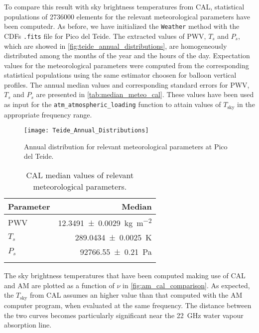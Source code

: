 To compare this result with sky brightness temperatures from CAL,
statistical populations of \num{2736000} elements for the relevant
meteorological parameters have been computedr. As before, we have
initialized the \texttt{Weather} method with the CDFs \texttt{.fits} file
for Pico del Teide. The extracted values of PWV, $T_s$ and $P_s$, which are
showed in \autoref{fig:teide_annual_distributions}, are homogeneously
distributed among the months of the year and the hours of the day.
Expectation values for the meteorological parameters were computed from the
corresponding statistical populations using the same estimator choosen for
balloon vertical profiles. The annual median values and corresponding
standard errors for PWV, $T_s$ and $P_s$ are presented in
\autoref{tab:median_meteo_cal}.  These values have been used as input for
the \texttt{atm\_atmospheric\_loading} function to attain values of $T_\text{sky}$
in the appropriate frequency range.

\begin{figure}
        \centering
        \texttt{[image: Teide\_Annual\_Distributions]}
        \caption{Annual distribution for relevant meteorological parameters
        at Pico del Teide.}
        \label{fig:teide_annual_distributions}
\end{figure}

\begin{table}
        \renewcommand{\arraystretch}{1.5}
        \centering
        \begin{tabular}{p{5cm} r}
                \hline
                Parameter & Median  \\
                \hline
                \hline
                PWV \dotfill & \SI{12.3491 \pm 0.0029}{\kilo\gram\per\square\meter} \\
                $T_s$ \dotfill& \SI{289.0434 \pm 0.0025}{\kelvin} \\
                $P_s$ \dotfill &  \SI{92766.55 \pm 0.21}{\pascal} \\
                \noalign{\smallskip}
                \hline
        \end{tabular}
        \caption{CAL median values of relevant meteorological parameters.}
        \label{tab:median_meteo_cal}
\end{table}

The sky brightness temperatures that have been computed making use of CAL
and AM are plotted as a function of $\nu$ in
\autoref{fig:am_cal_comparison}. As expected, the $T_\text{sky}$
from CAL assumes an higher value than that computed with the AM computer
program, when evaluated at the same
frequency. The distance between the two curves becomes particularly
significant near the \SI{22}{\giga\hertz} water vapour absorption line.


